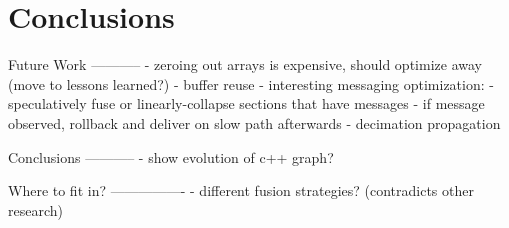 \chapter{Conclusions}
\label{chap:conclusions}

Future Work
-----------
- zeroing out arrays is expensive, should optimize away (move to lessons learned?)
- buffer reuse
- interesting messaging optimization:
  - speculatively fuse or linearly-collapse sections that have messages
  - if message observed, rollback and deliver on slow path afterwards
- decimation propagation

Conclusions
-----------
- show evolution of c++ graph?

Where to fit in?
----------------
- different fusion strategies?  (contradicts other research)
